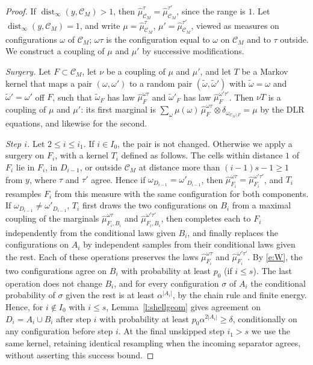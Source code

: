 \begin{proof}
If $\operatorname{dist}_\infty(y, \mathcal C_M) > 1$, then $\hat\mu^\tau_{\mathcal C_M} = \hat\mu^{\tau'}_{\mathcal C_M}$, since the range is $1$. Let $\operatorname{dist}_\infty(y, \mathcal C_M) = 1$, and write $\mu = \hat\mu^\tau_{\mathcal C_M}$, $\mu' = \hat\mu^{\tau'}_{\mathcal C_M}$, viewed as measures on configurations $\omega$ of $\mathcal C_M$; $\omega\tau$ is the configuration equal to $\omega$ on $\mathcal C_M$ and to $\tau$ outside. We construct a coupling of $\mu$ and $\mu'$ by successive modifications.

\emph{Surgery.} Let $F \subset \mathcal C_M$, let $\nu$ be a coupling of $\mu$ and $\mu'$, and let $T$ be a Markov kernel that maps a pair $(\omega, \omega')$ to a random pair $(\tilde \omega, \tilde \omega')$ with $\tilde \omega = \omega$ and $\tilde \omega' = \omega'$ off $F$, such that $\tilde \omega_F$ has law $\hat\mu^{\omega\tau}_F$ and $\tilde\omega'_F$ has law $\hat\mu^{\omega'\tau'}_F$. Then $\nu T$ is a coupling of $\mu$ and $\mu'$: its first marginal is $\sum_\omega \mu(\omega) \, \hat\mu^{\omega \tau}_F \otimes \delta_{\omega_{\mathcal C_M \setminus F}} = \mu$ by the DLR equations, and likewise for the second.

\emph{Step $i$.} Let $2 \le i \le i_1$. If $i \in I_0$, the pair is not changed. Otherwise we apply a surgery on $F_i$, with a kernel $T_i$ defined as follows. The cells within distance $1$ of $F_i$ lie in $F_i$, in $D_{i - 1}$, or outside $\mathcal C_M$ at distance more than $(i - 1)s - 1 \ge 1$ from $y$, where $\tau$ and $\tau'$ agree. Hence if $\omega_{D_{i - 1}} = \omega'_{D_{i - 1}}$, then $\hat\mu^{\omega\tau}_{F_i} = \hat\mu^{\omega'\tau'}_{F_i}$, and $T_i$ resamples $F_i$ from this measure with the same configuration for both components. If $\omega_{D_{i - 1}} \neq \omega'_{D_{i - 1}}$, $T_i$ first draws the two configurations on $B_i$ from a maximal coupling of the marginals $\hat\mu^{\omega\tau}_{F_i, B_i}$ and $\hat\mu^{\omega'\tau'}_{F_i, B_i}$, then completes each to $F_i$ independently from the conditional laws given $B_i$, and finally replaces the configurations on $A_i$ by independent samples from their conditional laws given the rest. Each of these operations preserves the laws $\hat\mu^{\omega\tau}_{F_i}$ and $\hat\mu^{\omega'\tau'}_{F_i}$. By \eqref{e:W}, the two configurations agree on $B_i$ with probability at least $p_0$ (if $i \le s$). The last operation does not change $B_i$, and for every configuration $\sigma$ of $A_i$ the conditional probability of $\sigma$ given the rest is at least $\alpha^{|A_i|}$, by the chain rule and finite energy. Hence, for $i\notin I_0$ with $i\le s$, Lemma~\ref{l:shellgeom} gives agreement on $D_i=A_i\cup B_i$ after step $i$ with probability at least $p_0\alpha^{2|A_i|}\ge\delta$, conditionally on any configuration before step $i$. At the final unskipped step $i_1>s$ we use the same kernel, retaining identical resampling when the incoming separator agrees, without asserting this success bound.


\end{proof}
